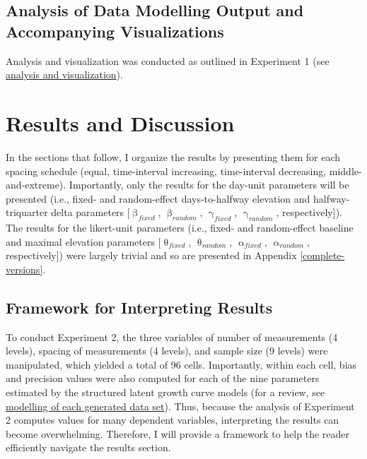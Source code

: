 \documentclass[
12pt, %
twoside,
english]{guelphthesis}
\begin{document}
\hypertarget{analysis-of-data-modelling-output-and-accompanying-visualizations}{%
\subsection{Analysis of Data Modelling Output and Accompanying Visualizations}\label{analysis-of-data-modelling-output-and-accompanying-visualizations}}

Analysis and visualization was conducted as outlined in Experiment 1 (see \protect\hyperlink{analysis-visualizationux5cux257D}{analysis and visualization}).

\hypertarget{results-and-discussion-1}{%
\section{Results and Discussion}\label{results-and-discussion-1}}

In the sections that follow, I organize the results by presenting them for each spacing schedule (equal, time-interval increasing, time-interval decreasing, middle-and-extreme). Importantly, only the results for the day-unit parameters will be presented (i.e., fixed- and random-effect days-to-halfway elevation and halfway-triquarter delta parameters {[}\(\upbeta_{fixed}\), \(\upbeta_{random}\), \(\upgamma_{fixed}\), \(\upgamma_{random}\), respectively{]}). The results for the likert-unit parameters (i.e., fixed- and random-effect baseline and maximal elevation parameters {[}\(\uptheta_{fixed}\), \(\uptheta_{random}\), \(\upalpha_{fixed}\), \(\upalpha_{random}\), respectively{]}) were largely trivial and so are presented in Appendix \ref{complete-versions}.

\hypertarget{framework-for-interpreting-results-1}{%
\subsection{Framework for Interpreting Results}\label{framework-for-interpreting-results-1}}

To conduct Experiment 2, the three variables of number of measurements (4 levels), spacing of measurements (4 levels), and sample size (9 levels) were manipulated, which yielded a total of 96 cells. Importantly, within each cell, bias and precision values were also computed for each of the nine parameters estimated by the structured latent growth curve models (for a review, see \protect\hyperlink{modelling-data-sets}{modelling of each generated data set}). Thus, because the analysis of Experiment 2 computes values for many dependent variables, interpreting the results can become overwhelming. Therefore, I will provide a framework to help the reader efficiently navigate the results section.
\end{document}
